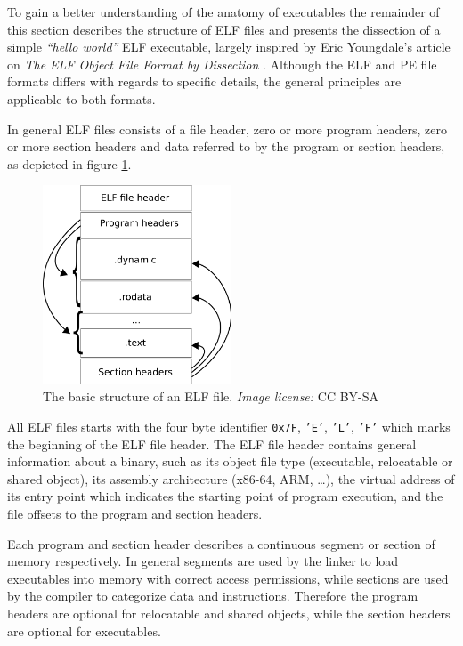 To gain a better understanding of the anatomy of executables the remainder of this section describes the structure of ELF files and presents the dissection of a simple \textit{``hello world''} ELF executable, largely inspired by Eric Youngdale's article on \textit{The ELF Object File Format by Dissection} \cite{elf_dissection}. Although the ELF and PE file formats differs with regards to specific details, the general principles are applicable to both formats.

In general ELF files consists of a file header, zero or more program headers, zero or more section headers and data referred to by the program or section headers, as depicted in figure \ref{fig:elf_file_structure}.

\begin{figure}[htbp]
	\begin{center}
		\includegraphics[width=0.5\textwidth]{inc/elf_file_structure.png}
		\caption{The basic structure of an ELF file. \textit{Image license:} CC BY-SA \cite{elf_structure_orig}}
		\label{fig:elf_file_structure}
	\end{center}
\end{figure}

All ELF files starts with the four byte identifier \texttt{0x7F}, \texttt{'E'}, \texttt{'L'}, \texttt{'F'} which marks the beginning of the ELF file header. The ELF file header contains general information about a binary, such as its object file type (executable, relocatable or shared object), its assembly architecture (x86-64, ARM, …), the virtual address of its entry point which indicates the starting point of program execution, and the file offsets to the program and section headers.

Each program and section header describes a continuous segment or section of memory respectively. In general segments are used by the linker to load executables into memory with correct access permissions, while sections are used by the compiler to categorize data and instructions. Therefore the program headers are optional for relocatable and shared objects, while the section headers are optional for executables.

